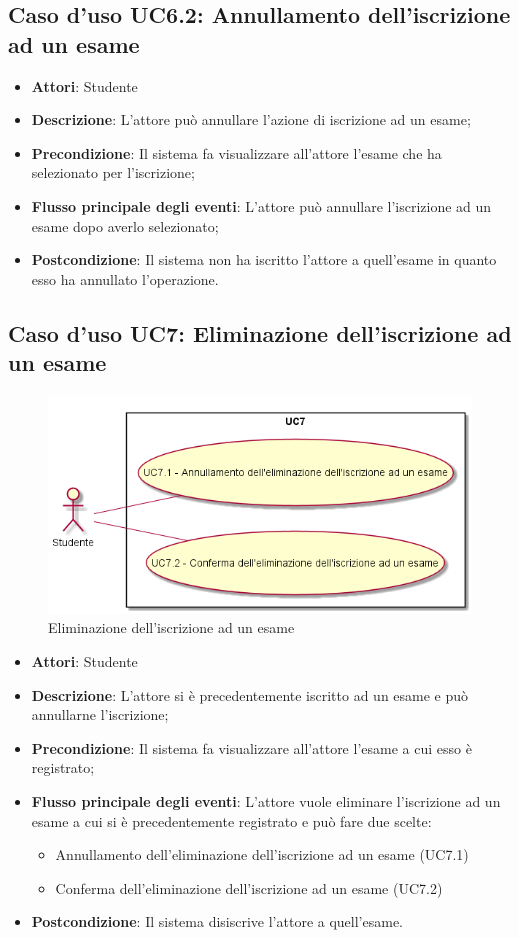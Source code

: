 \subsection{Caso d'uso \texorpdfstring{UC6.2}{UC6.2}: Annullamento dell'iscrizione ad un esame}
\begin{itemize}
\item \textbf{Attori}: Studente
\item \textbf{Descrizione}: L'attore può annullare l'azione di iscrizione ad un esame;
\item \textbf{Precondizione}: Il sistema fa visualizzare all'attore l'esame che ha selezionato per l'iscrizione;

\item \textbf{Flusso principale degli eventi}: L'attore può annullare l'iscrizione ad un esame dopo averlo selezionato;
\item \textbf{Postcondizione}: Il sistema non ha iscritto l'attore a quell'esame in quanto esso ha annullato l'operazione.

\end{itemize}
\subsection{Caso d'uso \texorpdfstring{UC7}{UC7}: Eliminazione dell'iscrizione ad un esame}
\begin{figure} [H]
\centering
\includegraphics[scale=0.45]{./img/UC7.png}
\caption{Eliminazione dell'iscrizione ad un esame}\label{}
\end{figure}
\begin{itemize}
\item \textbf{Attori}: Studente
\item \textbf{Descrizione}: L'attore si è precedentemente iscritto ad un esame e può annullarne l'iscrizione;
\item \textbf{Precondizione}: Il sistema fa visualizzare all'attore l'esame a cui esso è registrato;
\item \textbf{Flusso principale degli eventi}: L'attore vuole eliminare l'iscrizione ad un esame a cui si è precedentemente registrato e può fare due scelte:
\begin{itemize}
\item Annullamento dell'eliminazione dell'iscrizione ad un esame (UC7.1)
\item Conferma dell'eliminazione dell'iscrizione ad un esame (UC7.2)
\end{itemize}
\item \textbf{Postcondizione}: Il sistema disiscrive l'attore a quell'esame.
\end{itemize}
